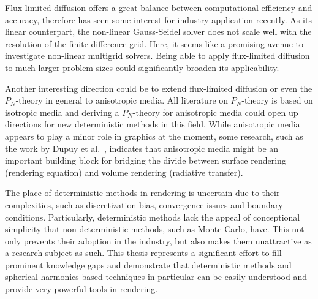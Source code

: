 Flux-limited diffusion offers a great balance between computational efficiency and accuracy, therefore has seen some interest for industry application recently. As its linear counterpart, the non-linear Gauss-Seidel solver does not scale well with the resolution of the finite difference grid. Here, it seems like a promising avenue to investigate non-linear multigrid solvers. Being able to apply flux-limited diffusion to much larger problem sizes could significantly broaden its applicability.

Another interesting direction could be to extend flux-limited diffusion or even the $P_N$-theory in general to anisotropic media. All literature on $P_N$-theory is based on isotropic media and deriving a $P_N$-theory for anisotropic media could open up directions for new deterministic methods in this field. While anisotropic media appears to play a minor role in graphics at the moment, some research, such as the work by Dupuy et al.~\cite{Dupuy16}, indicates that anisotropic media might be an important building block for bridging the divide between surface rendering (rendering equation) and volume rendering (radiative transfer).

The place of deterministic methods in rendering is uncertain due to their complexities, such as discretization bias, convergence issues and boundary conditions. Particularly, deterministic methods lack the appeal of conceptional simplicity that non-deterministic methods, such as Monte-Carlo, have. This not only prevents their adoption in the industry, but also makes them unattractive as a research subject as such. This thesis represents a significant effort to fill prominent knowledge gaps and demonstrate that deterministic methods and spherical harmonics based techniques in particular can be easily understood and provide very powerful tools in rendering.







